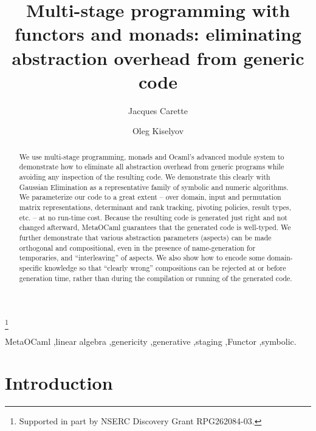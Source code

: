 \documentclass{elsart}
\begin{document}
\begin{frontmatter}
\title{Multi-stage programming with functors and monads:
eliminating abstraction overhead from generic code}
\author{Jacques Carette}
\address{McMaster University,
1280 Main St. West, Hamilton, Ontario Canada L8S 4K1}
\author{Oleg Kiselyov}
\address{FNMOC, Monterey, CA 93943}


\thanks[1]{Supported in part by NSERC Discovery Grant RPG262084-03.}

\begin{abstract}
We use multi-stage programming, monads and Ocaml's
advanced module system to demonstrate how to eliminate all
abstraction overhead from generic programs while avoiding any inspection of
the resulting code.  We demonstrate this clearly with Gaussian Elimination as a 
representative family of symbolic and numeric algorithms. 
We parameterize our code to a great extent --
over domain, input and permutation matrix representations, 
determinant and rank tracking, 
pivoting policies, result types, etc. -- at no run-time cost.  Because
the resulting code is generated just right and not changed afterward,
MetaOCaml guarantees that the generated code is well-typed.
We further demonstrate that various abstraction parameters (aspects)
can be made orthogonal and compositional, even in the presence of
name-generation for temporaries, and 
``interleaving'' of aspects.  We also show how to encode some
domain-specific knowledge so that ``clearly wrong'' compositions can
be rejected at or before generation time, rather than during
the compilation or running of the generated code.
\end{abstract}

\begin{keyword}
MetaOCaml \sep linear algebra \sep genericity \sep generative \sep staging
\sep Functor \sep symbolic.
\end{keyword}
\end{frontmatter}

\section{Introduction}
\end{document}
